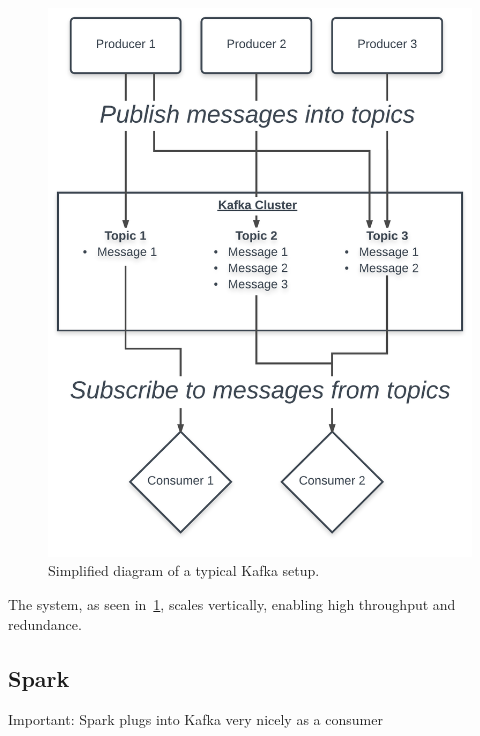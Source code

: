 \begin{figure}
    \centering
    \caption{Simplified diagram of a typical Kafka setup.}
    \label{fig:kafka}
    \includegraphics[width=\textwidth]{../figures/kafka.pdf}
\end{figure}

The system, as seen in~\ref{fig:kafka}, scales vertically, enabling high throughput and redundance.

\subsection{Spark}
\label{subsec:spark}

Important: Spark plugs into Kafka very nicely as a consumer

